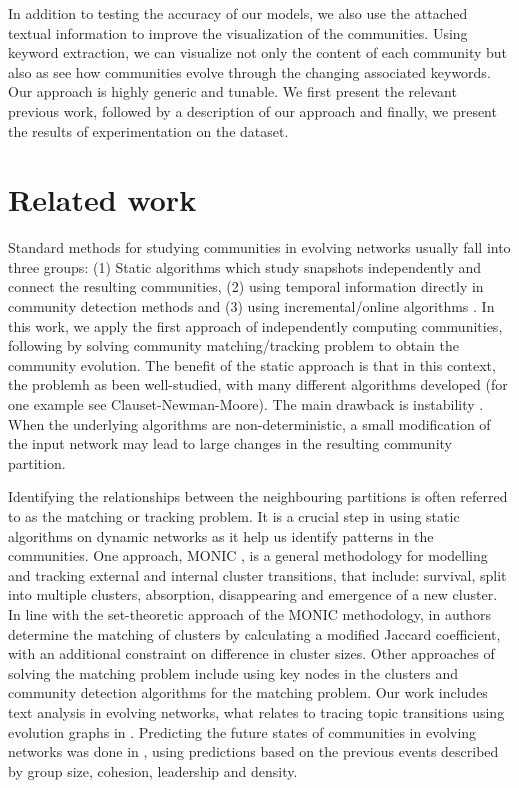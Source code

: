\documentclass{article} %
\begin{document}
In addition to testing the accuracy of our models, we also use the
attached textual information to improve the visualization of the
communities. Using keyword extraction, we can visualize not only the
content of each community but also as see how communities evolve
through the changing associated keywords. Our approach is highly
generic and tunable. We first present the relevant previous work,
followed by a description of our approach and finally, we present the
results of experimentation on the dataset.

\section{Related work}
Standard methods for studying communities in evolving networks usually fall into three groups: (1) Static algorithms which study snapshots independently  and connect the resulting communities, (2) using temporal information directly in community detection methods and (3) using incremental/online algorithms \cite{aynaud}. In this work, we apply the first approach of independently computing communities, following by solving community matching/tracking problem to obtain the community evolution. The benefit of  the static approach is that in this context, the problemh as been  well-studied, with many different algorithms developed (for one example see Clauset-Newman-Moore\cite{clauset-newman-moore}). The main drawback is  instability \cite{aynaud2010}. When the underlying algorithms are  non-deterministic, a small modification of the input network may lead to large changes in the resulting community partition.
 
Identifying the relationships between the neighbouring partitions is often referred to as the matching or tracking problem. It is a crucial step in using static algorithms on dynamic networks as it help us identify patterns in the communities. One approach, MONIC \cite{spiliopoulou}, is a general methodology for modelling and tracking external and internal cluster transitions, that include: survival, split into multiple clusters, absorption, disappearing and emergence of a new cluster. In line with the set-theoretic approach of  the MONIC methodology, in \cite{gliwa2013} authors determine the  matching of clusters by calculating a modified Jaccard coefficient, with an additional constraint on difference in cluster sizes. Other approaches of solving the matching problem include using key nodes in the clusters \cite{wang} and community detection algorithms for the matching problem\cite{palla}. Our work includes text analysis in evolving networks, what relates to tracing topic transitions using evolution graphs in \cite{mei2005}. Predicting the future states of communities in evolving networks was done in \cite{gliwa2013}, using predictions  based on the previous events described by group size, cohesion, leadership and density.
\end{document}
